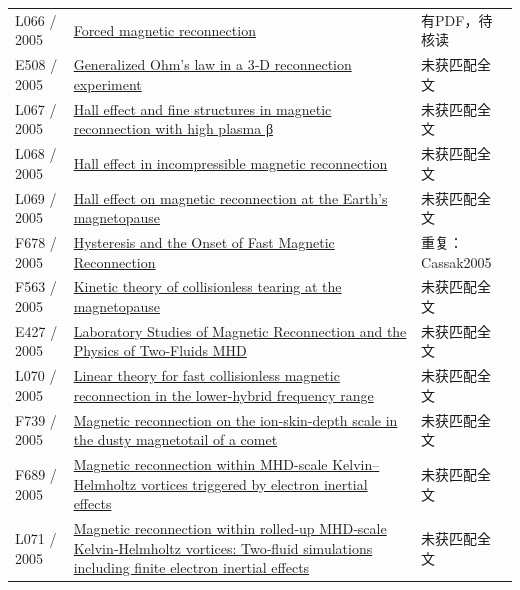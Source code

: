 \begin{longtable}{P{24mm}P{97mm}P{27mm}}
L066 / 2005 & \href{https://doi.org/10.1029/2004gl022058}{Forced magnetic reconnection} & 有PDF，待核读\\

E508 / 2005 & \href{https://doi.org/10.1029/2004gl021245}{Generalized Ohm's law in a 3‐D reconnection experiment} & 未获匹配全文\\

L067 / 2005 & \href{https://doi.org/10.1063/1.1870003}{Hall effect and fine structures in magnetic reconnection with high plasma β} & 未获匹配全文\\

L068 / 2005 & \href{https://doi.org/10.1029/2004ja010675}{Hall effect in incompressible magnetic reconnection} & 未获匹配全文\\

L069 / 2005 & \href{https://doi.org/10.1016/j.jastp.2005.03.013}{Hall effect on magnetic reconnection at the Earth's magnetopause} & 未获匹配全文\\

F678 / 2005 & \href{https://arxiv.org/pdf/physics/0502001}{Hysteresis and the Onset of Fast Magnetic Reconnection} & 重复：Cassak2005\\

F563 / 2005 & \href{https://doi.org/10.1029/2004ja010751}{Kinetic theory of collisionless tearing at the magnetopause} & 未获匹配全文\\

E427 / 2005 & \href{http://ui.adsabs.harvard.edu/abs/2005AGUFMSM11B..02Y/abstract}{Laboratory Studies of Magnetic Reconnection and the Physics of Two-Fluids MHD} & 未获匹配全文\\

L070 / 2005 & \href{https://doi.org/10.1063/1.1900094}{Linear theory for fast collisionless magnetic reconnection in the lower-hybrid frequency range} & 未获匹配全文\\

F739 / 2005 & \href{https://doi.org/10.1063/1.1883184}{Magnetic reconnection on the ion-skin-depth scale in the dusty magnetotail of a comet} & 未获匹配全文\\

F689 / 2005 & \href{https://doi.org/10.1016/j.asr.2005.01.057}{Magnetic reconnection within MHD-scale Kelvin–Helmholtz vortices triggered by electron inertial effects} & 未获匹配全文\\

L071 / 2005 & \href{https://doi.org/10.1029/2005gl023362}{Magnetic reconnection within rolled‐up MHD‐scale Kelvin‐Helmholtz vortices: Two‐fluid simulations including finite electron inertial effects} & 未获匹配全文\\


\end{longtable}
